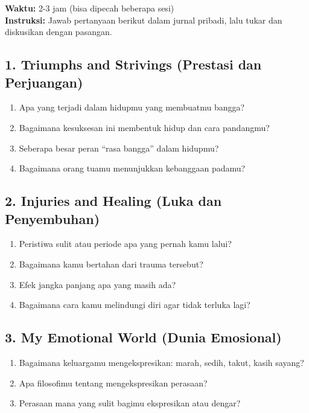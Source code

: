 \begin{exercisebox}
\textbf{Waktu:} 2-3 jam (bisa dipecah beberapa sesi)\\
\textbf{Instruksi:} Jawab pertanyaan berikut dalam jurnal pribadi, lalu tukar dan diskusikan dengan pasangan.

\subsection*{1. Triumphs and Strivings (Prestasi dan Perjuangan)}
\begin{enumerate}
    \item Apa yang terjadi dalam hidupmu yang membuatmu bangga?
    \item Bagaimana kesuksesan ini membentuk hidup dan cara pandangmu?
    \item Seberapa besar peran ``rasa bangga'' dalam hidupmu?
    \item Bagaimana orang tuamu menunjukkan kebanggaan padamu?
\end{enumerate}

\subsection*{2. Injuries and Healing (Luka dan Penyembuhan)}
\begin{enumerate}
    \item Peristiwa sulit atau periode apa yang pernah kamu lalui?
    \item Bagaimana kamu bertahan dari trauma tersebut?
    \item Efek jangka panjang apa yang masih ada?
    \item Bagaimana cara kamu melindungi diri agar tidak terluka lagi?
\end{enumerate}

\subsection*{3. My Emotional World (Dunia Emosional)}
\begin{enumerate}
    \item Bagaimana keluargamu mengekspresikan: marah, sedih, takut, kasih sayang?
    \item Apa filosofimu tentang mengekspresikan perasaan?
    \item Perasaan mana yang sulit bagimu ekspresikan atau dengar?
\end{enumerate}


\end{exercisebox}
